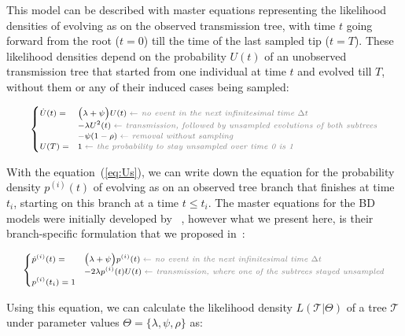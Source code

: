 \documentclass[a4paper,10pt]{article}
\begin{document}
This model can be described with master equations representing the likelihood densities of evolving as on the observed transmission tree, with time $t$ going forward from the root ($t=0$) till the time of the last sampled tip ($t=T$). These likelihood densities depend on the probability $U(t)$ of an unobserved transmission tree that started from one individual at time $t$ and evolved till $T$, without them or any of their induced cases being sampled: 

\begin{equation}
\scriptsize
\begin{cases}
\dot{U}(t) = &\Big(\lambda + \psi\Big) U(t)\; \textit{\color{gray} $\leftarrow$ no event in the next infinitesimal time $\Delta t$ }\\
    &- \lambda U^2(t) \;  \textit{\color{gray} $\leftarrow$ transmission, followed by unsampled evolutions of both subtrees}\\
    &- \psi (1 - \rho)\;  \textit{\color{gray} $\leftarrow$ removal without sampling}\\
U(T) = & 1\;  \textit{\color{gray} $\leftarrow$ the probability to stay unsampled over time 0 is 1} \label{eq:Us}
\end{cases}
\end{equation}


With the equation~(\ref{eq:Us}), we can write down the equation for the probability density $p^{(i)}(t)$ of evolving as on an observed tree branch that finishes at time $t_i$, starting on this branch at a time $t \leq t_i$. The master equations for the BD models were initially developed by ~\citet{Stadler2009}, however what we present here, is their branch-specific formulation that we proposed in~\cite{zhukovaFastAccurateMaximumLikelihood2022}:

\begin{equation}
\scriptsize
\begin{cases}
\dot{p}^{(i)}(t) = & \Big(\lambda + \psi\Big) p^{(i)}(t)\; \textit{\color{gray} $\leftarrow$ no event in the next infinitesimal time $\Delta t$ }\\
    & - 2 \lambda p^{(i)}(t)U(t)\;  \textit{\color{gray} $\leftarrow$ transmission, where one of the subtrees stayed unsampled}\\
p^{(i)}(t_i) = 1
\end{cases}\label{eq:p}
\end{equation}

Using this equation, we can calculate the likelihood density $L(\mathscr{T}|\Theta)$ of a tree $\mathscr{T}$ under parameter values $\Theta = \{\lambda, \psi, \rho\}$ as:
\end{document}
